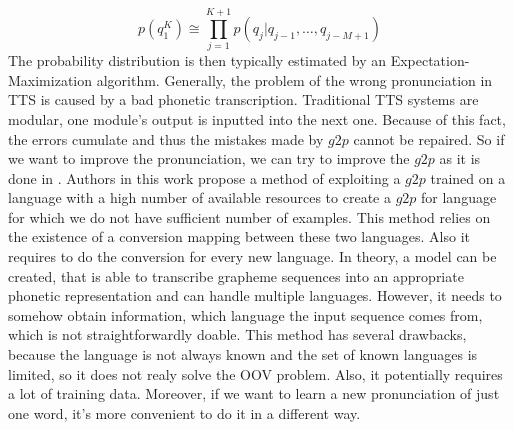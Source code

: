 \begin{equation}
p(q_1^K) \cong \prod_{j=1}^{K+1} p(q_j\vert q_{j-1},\dots,q_{j-M+1})
\end{equation}
The probability distribution is then typically estimated by an Expectation-Maximization algorithm.
\linebreak \linebreak
Generally, the problem of the wrong pronunciation in TTS  is caused by a bad phonetic transcription.
Traditional TTS systems are modular, one module's output is inputted into the next one.
Because of this fact, the errors cumulate and thus the mistakes made by $g2p$ cannot be repaired.
So if we want to improve the pronunciation, we can try to improve the $g2p$ as it is done in \cite{deri2016grapheme}.
Authors in this work propose a method of exploiting a $g2p$ trained on a language with a high number of available resources to create a $g2p$ for language for which we do not have sufficient number of examples.
This method relies on the existence of a conversion mapping between these two languages.
Also it requires to do the conversion for every new language.
In theory, a model can be created, that is able to transcribe grapheme sequences into an appropriate phonetic representation and can handle multiple languages.
However, it needs to somehow obtain information, which language the input sequence comes from, which is not straightforwardly doable.
This method has several drawbacks, because the language is not always known and the set of known languages is limited, so it does not realy solve the OOV problem.
Also, it potentially requires a lot of training data.
Moreover, if we want to learn a new pronunciation of just one word, it's more convenient to do it in a different way.

